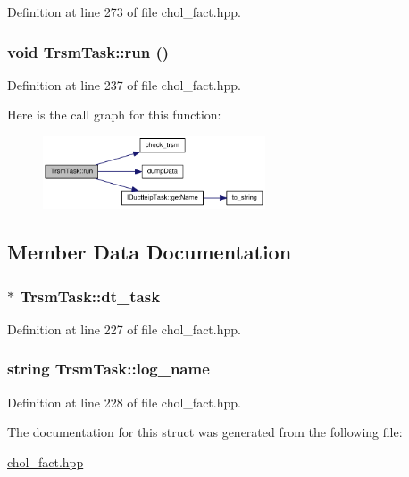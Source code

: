 Definition at line 273 of file chol\_\-fact.hpp.\hypertarget{struct_trsm_task_ae66d4dcdaa716dd1a19d2b5f08eb0c52}{
\subsubsection[{run}]{\setlength{\rightskip}{0pt plus 5cm}void TrsmTask::run ()}}
\label{struct_trsm_task_ae66d4dcdaa716dd1a19d2b5f08eb0c52}


Definition at line 237 of file chol\_\-fact.hpp.

Here is the call graph for this function:\nopagebreak
\begin{figure}[H]
\begin{center}
\leavevmode
\includegraphics[width=187pt]{struct_trsm_task_ae66d4dcdaa716dd1a19d2b5f08eb0c52_cgraph}
\end{center}
\end{figure}


\subsection{Member Data Documentation}
\hypertarget{struct_trsm_task_a8e255de9073927c7aa5de446491ec127}{
\subsubsection[{dt\_\-task}]{$\ast$ {\bf TrsmTask::dt\_\-task}}}
\label{struct_trsm_task_a8e255de9073927c7aa5de446491ec127}


Definition at line 227 of file chol\_\-fact.hpp.\hypertarget{struct_trsm_task_a38d401b01930562a1b8a21e8bae749a4}{
\subsubsection[{log\_\-name}]{\setlength{\rightskip}{0pt plus 5cm}string {\bf TrsmTask::log\_\-name}}}
\label{struct_trsm_task_a38d401b01930562a1b8a21e8bae749a4}


Definition at line 228 of file chol\_\-fact.hpp.

The documentation for this struct was generated from the following file:\begin{DoxyCompactItemize}
\item 
\hyperlink{chol__fact_8hpp}{chol\_\-fact.hpp}\end{DoxyCompactItemize}
